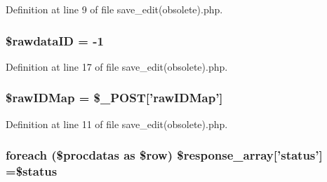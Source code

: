 Definition at line 9 of file save\-\_\-edit(obsolete).\-php.

\hypertarget{processing_2obsolete_2save__edit_07obsolete_08_8php_a7e1df84a3733bb1672c8485fa286658d}{
\subsubsection[{\$rawdata\-I\-D}]{\setlength{\rightskip}{0pt plus 5cm}\$rawdata\-I\-D = -\/1}}\label{processing_2obsolete_2save__edit_07obsolete_08_8php_a7e1df84a3733bb1672c8485fa286658d}


Definition at line 17 of file save\-\_\-edit(obsolete).\-php.

\hypertarget{processing_2obsolete_2save__edit_07obsolete_08_8php_a2c543a123b646cdf11c814983d4a13cf}{
\subsubsection[{\$raw\-I\-D\-Map}]{\setlength{\rightskip}{0pt plus 5cm}\$raw\-I\-D\-Map = \$\-\_\-\-P\-O\-S\-T\mbox{[}'raw\-I\-D\-Map'\mbox{]}}}\label{processing_2obsolete_2save__edit_07obsolete_08_8php_a2c543a123b646cdf11c814983d4a13cf}


Definition at line 11 of file save\-\_\-edit(obsolete).\-php.

\hypertarget{processing_2obsolete_2save__edit_07obsolete_08_8php_a7a23fc905184e8d9769c6c2948032a18}{
\subsubsection[{\$response\-\_\-array}]{\setlength{\rightskip}{0pt plus 5cm}foreach (\$procdatas as \$row) \$response\-\_\-array\mbox{[}'status'\mbox{]} =\$status}}\label{processing_2obsolete_2save__edit_07obsolete_08_8php_a7a23fc905184e8d9769c6c2948032a18}


